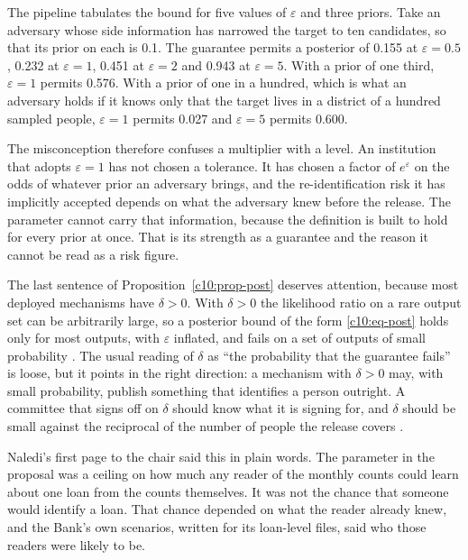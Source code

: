 The pipeline tabulates the bound for five values of $\varepsilon$ and three
priors. Take an adversary whose side information has narrowed the target to ten
candidates, so that its prior on each is 0.1. The guarantee permits a posterior
of 0.155 at $\varepsilon = 0.5$, 0.232 at $\varepsilon = 1$, 0.451 at
$\varepsilon = 2$ and 0.943 at $\varepsilon = 5$.
With a prior of one third, $\varepsilon = 1$ permits 0.576. With a prior of one in
a hundred, which is what an adversary holds if it knows only that the target lives
in a district of a hundred sampled people, $\varepsilon = 1$ permits 0.027 and
$\varepsilon = 5$ permits 0.600.

The misconception therefore confuses a multiplier with a level. An institution
that adopts $\varepsilon = 1$ has not chosen a tolerance. It has chosen a factor
of $e^\varepsilon$ on the odds of whatever prior an adversary brings, and the
re-identification risk it has implicitly accepted depends on what the adversary
knew before the release. The parameter cannot carry that information, because the
definition is built to hold for every prior at once. That is its strength as a
guarantee and the reason it cannot be read as a risk figure.

The last sentence of Proposition~\ref{c10:prop-post} deserves attention, because
most deployed mechanisms have $\delta > 0$. With $\delta > 0$ the likelihood ratio
on a rare output set can be arbitrarily large, so a posterior bound of the form
\eqref{c10:eq-post} holds only for most outputs, with $\varepsilon$ inflated, and
fails on a set of outputs of small probability \citep{kasiviswanathan2014}. The
usual reading of $\delta$ as ``the probability that the guarantee fails'' is
loose, but it points in the right direction: a mechanism with $\delta > 0$ may,
with small probability, publish something that identifies a person outright. A
committee that signs off on $\delta$ should know what it is signing for, and
$\delta$ should be small against the reciprocal of the number of people the
release covers \citep{dwork2014}.

Naledi's first page to the chair said this in plain words. The parameter in the
proposal was a ceiling on how much any reader of the monthly counts could learn
about one loan from the counts themselves. It was not the chance that someone
would identify a loan. That chance depended on what the reader already knew, and
the Bank's own scenarios, written for its loan-level files, said who those readers
were likely to be.

